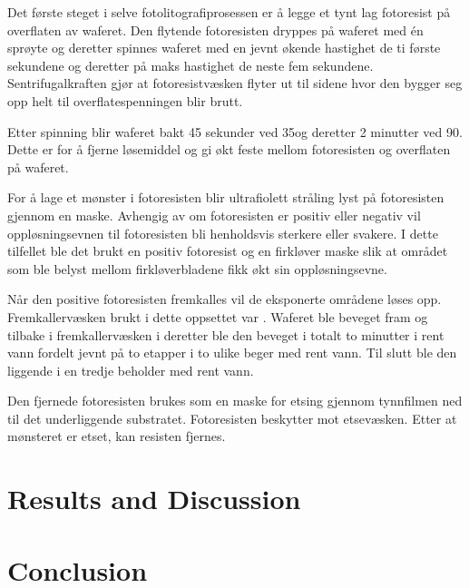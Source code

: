 \documentclass[5p]{elsarticle}    	                %
\begin{document}
Det første steget i selve fotolitografiprosessen er å legge et tynt lag fotoresist på overflaten av waferet. Den flytende fotoresisten dryppes på waferet med én sprøyte og deretter spinnes waferet med en jevnt økende hastighet de ti første sekundene og deretter på maks hastighet de neste fem sekundene. Sentrifugalkraften gjør at fotoresistvæsken flyter ut til sidene hvor den bygger seg opp helt til overflatespenningen blir brutt.

Etter spinning blir waferet bakt 45 sekunder ved 35\celsius og deretter 2 minutter ved 90\celsius. Dette er for å fjerne løsemiddel og gi økt feste mellom fotoresisten og overflaten på waferet.

For å lage et mønster i fotoresisten blir ultrafiolett stråling lyst på fotoresisten gjennom en maske. Avhengig av om fotoresisten er positiv eller negativ vil oppløsningsevnen til fotoresisten bli henholdsvis sterkere eller svakere. I dette tilfellet ble det brukt en positiv fotoresist og en firkløver maske slik at området som ble belyst mellom firkløverbladene fikk økt sin oppløsningsevne.

Når den positive fotoresisten fremkalles vil de eksponerte områdene løses opp. Fremkallervæsken brukt i dette oppsettet var . Waferet ble beveget fram og tilbake i fremkallervæsken i  deretter ble den beveget i totalt to minutter i rent vann fordelt jevnt på to etapper i to ulike beger med rent vann. Til slutt ble den liggende i en tredje beholder med rent vann.

Den fjernede fotoresisten brukes som en maske for etsing gjennom tynnfilmen ned til det underliggende substratet. Fotoresisten beskytter mot etsevæsken. Etter at mønsteret er etset, kan resisten fjernes. 





\section{Results and Discussion}


\section{Conclusion}


\section{\refname}


\end{document}
